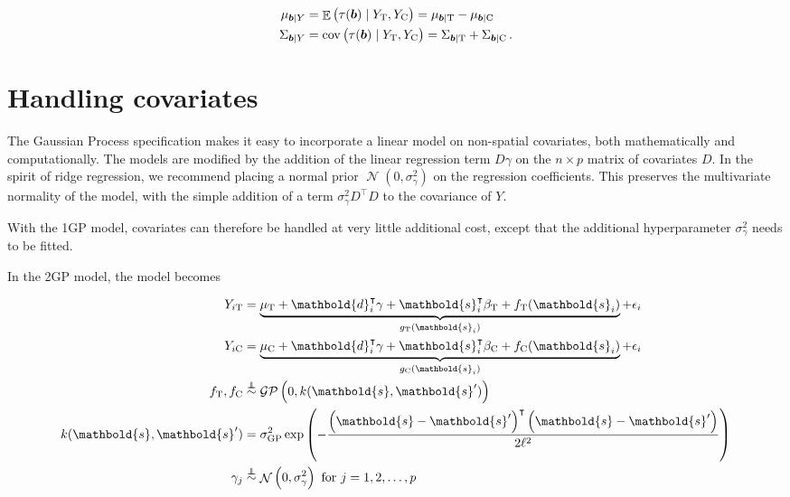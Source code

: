 \documentclass[letter]{article}
\DeclareMathOperator{\E}{\mathbb{E}}
\DeclareMathOperator{\cov}{{cov}}
\DeclareMathOperator{\normal}{\mathcal{N}}
\newcommand{\gp}{\mathcal{GP}}
\newcommand{\trans}{^{\intercal}}
\newcommand{\treat}{\mathrm{T}}
\newcommand{\ctrol}{\mathrm{C}}
\newcommand{\sigmaf}{\sigma_{\mathrm{GP}}}
\newcommand{\sigmagamma}{\sigma_{\gamma}}
\newcommand{\svec}{\mathbold{s}}
\newcommand{\dvec}{\mathbold{d}}
\newcommand{\indep}{\protect\mathpalette{\protect\independenT}{\perp}}
\def\independenT#1#2{\mathrel{\rlap{$#1#2$}\mkern2mu{#1#2}}}
\newcommand{\sentinels}{\bm{b}}
\newcommand{\eqlabel}[1]{\label{#1}}
\begin{document}
\begin{equation}
\begin{split}
    \mu_{\sentinels \mid Y} &= \E \del{\tau(\sentinels) \mid Y_\treat{}, Y_\ctrol{}} = \mu_{\sentinels \mid \treat} - \mu_{\sentinels \mid \ctrol} \\
    \Sigma_{\sentinels \mid Y} &= \cov\del{\tau(\sentinels) \mid Y_\treat{}, Y_\ctrol{}} = \Sigma_{\sentinels \mid \treat} + \Sigma_{\sentinels \mid \ctrol}\,.
\end{split}
\eqlabel{eq:postvar2gp}
\end{equation}
    


    	\section{Handling covariates}\label{handling-covariates}

The Gaussian Process specification makes it easy to incorporate a linear model on non-spatial covariates, both mathematically and computationally.
The models are modified by the addition of the linear regression term \(D \gamma\) on the \(n \times p\) matrix of covariates \(D\). In the spirit of ridge regression, we recommend placing a normal prior \(\normal(0,\sigmagamma^2)\) on the regression coefficients. This preserves the multivariate normality of the model, with the simple addition of a term \(\sigmagamma^2 D\trans D\) to the covariance of \(Y\).

With the 1GP model, covariates can therefore be handled at very little additional cost, except that the additional hyperparameter \(\sigmagamma^2\) needs to be fitted.

In the 2GP model, the model becomes

\begin{equation}
\begin{split}
Y_{i\treat} &= \underbrace{\mu_\treat{} + \dvec_i\trans \gamma + \svec_i\trans\beta_\treat{} + f_\treat{}(\svec_i)}_{g_\treat{}(\svec_i)} + \epsilon_i \\
Y_{i\ctrol} &= \underbrace{\mu_\ctrol{} + \dvec_i\trans \gamma + \svec_i\trans\beta_\ctrol{} + f_\ctrol{}(\svec_i)}_{g_\ctrol{}(\svec_i)} + \epsilon_i \\
f_\treat{}, f_\ctrol{} &\overset{\indep}{\sim} \gp\del{0, k(\svec, \svec')} \\
k(\svec,\svec') &= \sigmaf^2 \exp\del{ - \frac{\del{\svec-\svec'}\trans\del{\svec-\svec'}}{2 \ell^2}} \\
\gamma_j &\overset{\indep}{\sim} \normal\del{0,\sigmagamma^2}\text{ for }j=1,2,\ldots,p
\end{split}
\end{equation}
\end{document}
